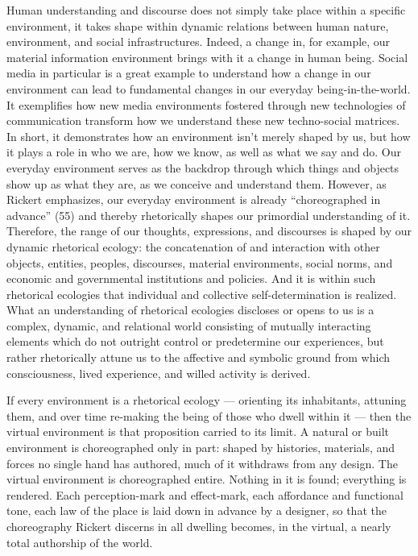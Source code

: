 \documentclass{article}
\begin{document}
Human understanding and discourse does not simply take place within a specific environment, it takes shape within dynamic relations between human nature, environment, and social infrastructures. Indeed, a change in, for example, our material information environment brings with it a change in human being. Social media in particular is a great example to understand how a change in our environment can lead to fundamental changes in our everyday being-in-the-world. It exemplifies how new media environments fostered through new technologies of communication transform how we understand these new techno-social matrices. In short, it demonstrates how an environment isn't merely shaped by us, but how it plays a role in who we are, how we know, as well as what we say and do. Our everyday environment serves as the backdrop through which things and objects show up as what they are, as we conceive and understand them. However, as Rickert emphasizes, our everyday environment is already ``choreographed in advance'' (55) and thereby rhetorically shapes our primordial understanding of it. Therefore, the range of our thoughts, expressions, and discourses is shaped by our dynamic rhetorical ecology: the concatenation of and interaction with other objects, entities, peoples, discourses, material environments, social norms, and economic and governmental institutions and policies. And it is within such rhetorical ecologies that individual and collective self-determination is realized. What an understanding of rhetorical ecologies discloses or opens to us is a complex, dynamic, and relational world consisting of mutually interacting elements which do not outright control or predetermine our experiences, but rather rhetorically attune us to the affective and symbolic ground from which consciousness, lived experience, and willed activity is derived.

If every environment is a rhetorical ecology — orienting its inhabitants, attuning them, and over time re-making the being of those who dwell within it — then the virtual environment is that proposition carried to its limit. A natural or built environment is choreographed only in part: shaped by histories, materials, and forces no single hand has authored, much of it withdraws from any design. The virtual environment is choreographed entire. Nothing in it is found; everything is rendered. Each perception-mark and effect-mark, each affordance and functional tone, each law of the place is laid down in advance by a designer, so that the choreography Rickert discerns in all dwelling becomes, in the virtual, a nearly total authorship of the world.
\end{document}

